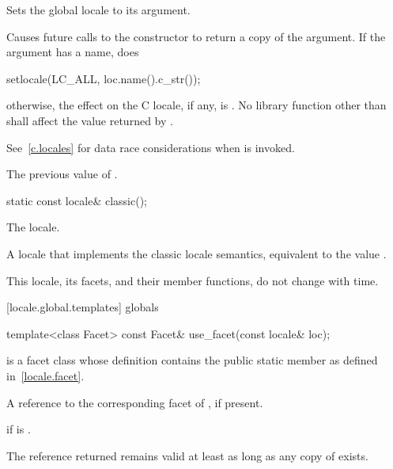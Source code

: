 \begin{itemdescr}
\pnum
Sets the global locale to its argument.

\pnum
\effects
Causes future calls to the constructor
to return a copy of the argument.
If the argument has a name, does

\begin{codeblock}
setlocale(LC_ALL, loc.name().c_str());
\end{codeblock}

otherwise, the effect on the C locale, if any, is .
No library function other than
shall affect the value returned by
.
\begin{note} See~\ref{c.locales} for data race considerations when
 is invoked. \end{note}

\pnum
\returns
The previous value of
.
\end{itemdescr}

%
\begin{itemdecl}
static const locale& classic();
\end{itemdecl}

\begin{itemdescr}
\pnum
The  locale.

\pnum
\returns
A locale that implements the classic  locale semantics, equivalent
to the value .

\pnum
\remarks
This locale, its facets, and their member functions, do not change
with time.
\end{itemdescr}

[locale.global.templates]{ globals}

%
\begin{itemdecl}
template<class Facet> const Facet& use_facet(const locale& loc);
\end{itemdecl}

\begin{itemdescr}
\pnum
\requires
{}
is a facet class whose definition contains the public static member
as defined in~\ref{locale.facet}.

\pnum
\returns
A reference to the corresponding facet of , if present.

\pnum
\throws
{}
if
is
.

\pnum
\remarks
The reference returned remains valid at least as long as any copy of
 exists.
\end{itemdescr}

